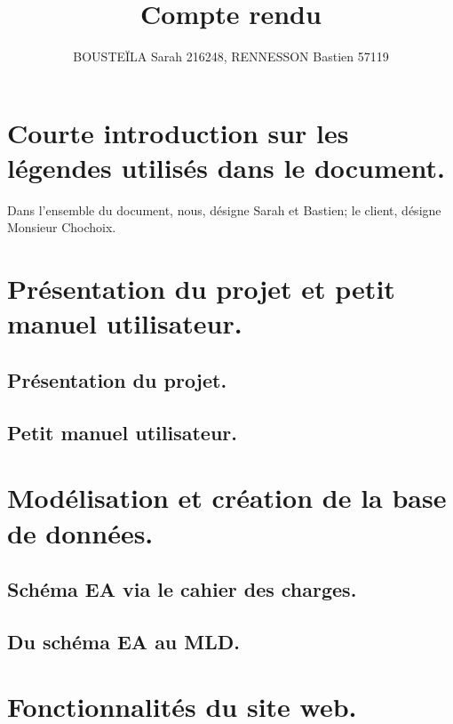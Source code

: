 \documentclass[12pt,a4paper]{article}
\begin{document}

\title{Compte rendu}%
\author{BOUSTEÏLA Sarah 216248, RENNESSON Bastien 57119}%
\maketitle




\section{Courte introduction sur les légendes utilisés dans le document.}
Dans l'ensemble du document, nous, désigne Sarah et Bastien; le client, désigne Monsieur Chochoix.

\section{Présentation du projet et petit manuel utilisateur.}
\subsection{Présentation du projet.}
\subsection{Petit manuel utilisateur.}
\section{Modélisation et création de la base de données.}
\subsection{Schéma EA via le cahier des charges.}
\subsection{Du schéma EA au MLD.}
\section{Fonctionnalités du site web.}
\end{document}
